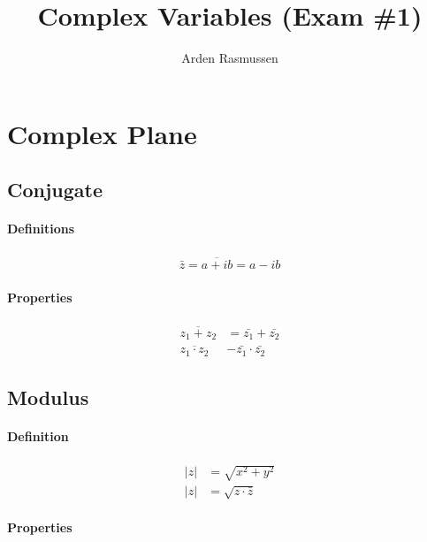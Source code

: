 \documentclass[12pt]{article}
\title{Complex Variables (Exam \#1)}
\author{Arden Rasmussen}
\begin{document}
\maketitle
\newpage
\tableofcontents
\newpage
{}


\section{Complex Plane}%
\label{sec:complex_plane}

\subsection{Conjugate}%
\label{sub:conjugate}

\paragraph{Definitions}%
\label{par:definitions}

\begin{align*}
  \bar{z} = \overline{a+ib}=a-ib
\end{align*}

\paragraph{Properties}%
\label{par:properties}

\begin{align*}
  \overline{z_1 + z_2}&=\bar{z_1} + \bar{z_2}\\
  \overline{z_1 \cdot z_2}&-\bar{z_1} \cdot \bar{z_2}
\end{align*}

\subsection{Modulus}%
\label{sub:modulus}

\paragraph{Definition}%
\label{par:definition}

\begin{align*}
  |z| &= \sqrt{x^2+y^2}\\
  |z| &= \sqrt{z\cdot \bar{z}}
\end{align*}

\paragraph{Properties}%
\label{par:properties}
\end{document}
